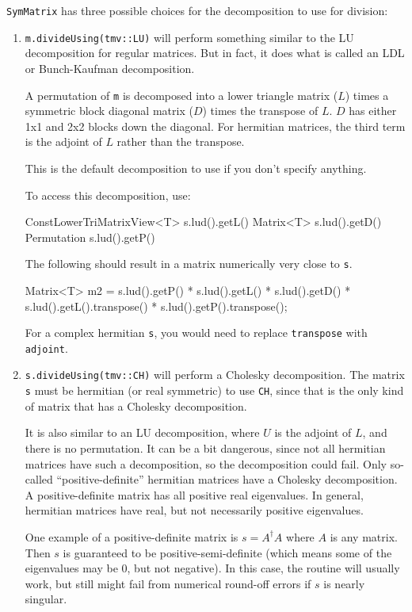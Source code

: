 \documentclass[twoside,letterpaper,11pt]{article}
\renewcommand{\tt}[1]{{\lstinline {#1}}}
\begin{document}
\tt{SymMatrix} has three possible choices for the decomposition to use for division:
\begin{enumerate}
\item
\tt{m.divideUsing(tmv::LU)} will perform something similar to the LU decomposition
for regular matrices.  But in fact, it does what is called an LDL or Bunch-Kaufman
decomposition.  

A permutation of \tt{m} is decomposed into a lower triangle matrix ($L$)
times a symmetric block diagonal matrix ($D$) times the transpose of $L$.
$D$ has either 1x1 and 2x2 blocks down the diagonal.  For hermitian matrices,
the third term is the adjoint of $L$ rather than the transpose.

This is the default decomposition to use if you don't specify anything.

To access this decomposition, use:
\begin{tmvcode}
ConstLowerTriMatrixView<T> s.lud().getL()
Matrix<T> s.lud().getD()
Permutation s.lud().getP()
\end{tmvcode}
The following should result in a matrix numerically very close to \tt{s}.
\begin{tmvcode}
Matrix<T> m2 = s.lud().getP() * s.lud().getL() * s.lud().getD() * 
      s.lud().getL().transpose() * s.lud().getP().transpose();
\end{tmvcode}
For a complex hermitian \tt{s}, you would need to replace
\tt{transpose} with \tt{adjoint}.

\item
\tt{s.divideUsing(tmv::CH)} will perform a Cholesky decomposition.  
The matrix \tt{s} must be hermitian (or real symmetric) to use \tt{CH}, since that is the
only kind of matrix that has a Cholesky decomposition.  

It is also similar to an 
LU decomposition, where $U$ is the adjoint of $L$, and there is no permutation.
It can be a bit dangerous, since not all hermitian matrices have such a decomposition,
so the decomposition could fail.  Only so-called ``positive-definite'' hermitian 
matrices have a Cholesky decomposition.  A positive-definite matrix has
all positive real eigenvalues.  In general, hermitian matrices have real, but
not necessarily positive eigenvalues.  

One example of a 
positive-definite matrix is $s = A^\dagger A$ where $A$ is any matrix.   
Then $s$ is guaranteed to be positive-semi-definite
(which means some of the eigenvalues may be 0, but not negative).
In this case, the routine will usually work, but still might fail from 
numerical round-off errors if $s$ is nearly singular.  


\end{enumerate}
\end{document}
